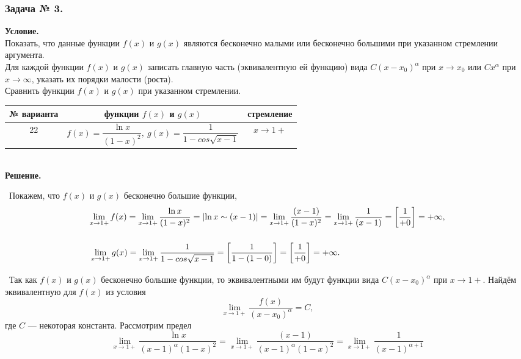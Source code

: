 \documentclass[12pt]{article}
\begin{document}
\subsubsection*{\center Задача № 3.}
{\bf Условие.~}\\
 Показать, что данные функции
$f(x)$ и $g(x)$ являются бесконечно малыми или бесконечно большими
при указанном стремлении аргумента. \\
 Для каждой функции $f(x)$ и $g(x)$ записать главную часть
(эквивалентную ей функцию)  вида $C(x-x_0)^{\alpha}$ при $x\rightarrow x_0$ или $Cx^{\alpha}$
при $x\rightarrow\infty$, указать их порядки малости (роста). \\
 Сравнить функции $f(x)$ и $g(x)$ при указанном стремлении.
\begin{center}
\begin{tabular}{|c|c|c|}
\hline
№ варианта & функции $f(x)$ и $g(x)$ & стремление \\[6pt]
\hline
22 & $f(x) = \dfrac{\ln{x}}{(1-x)^2},~g(x)=\dfrac{1}{1-cos\sqrt{x-1}}$ & $x\rightarrow1+$ \\
\hline
\end{tabular}
\bigskip
\\
{\bf Решение.~}\\
\end{center}
\medskip
{}~Покажем, что $f(x)$ и $g(x)$ бесконечно большие функции,
$$
\begin{array}{l} 
\lim\limits_{x\rightarrow 1+} f(x)=\lim\limits_{x\rightarrow 1+} \dfrac{\ln{x}}{(1-x)^2}=\left|\ln {x} \sim (x-1) \right|=\lim\limits_{x\rightarrow 1+} \dfrac{(x-1)}{(1-x)^2}=\lim\limits_{x\rightarrow 1+} \dfrac{1}{(x-1)}=\left[\dfrac{1}{+0} \right]=+\infty , 
\\ \medskip{}{}
\\ \medskip{}{}
\lim\limits_{x\rightarrow 1+} g(x)= \lim\limits_{x\rightarrow 1+}  \dfrac{1}{1-cos\sqrt{x-1}}=\left[\dfrac{1}{1-(1-0)} \right]=\left[\dfrac{1}{+0} \right]=+\infty.
\end{array}
$$
~Так как $f(x)$ и $g(x)$ бесконечно большие функции, то эквивалентными им будут функции вида 
$C(x-x_0)^{\alpha}$ при $x\rightarrow 1+$. Найдём эквивалентную для $f(x)$ из условия
$$
\lim\limits_{x\rightarrow 1+}\dfrac{f(x)}{(x-x_0)^{\alpha}} = C,
$$
где $C$ --- некоторая константа. Рассмотрим предел
$$
\lim\limits_{x\rightarrow 1+} \dfrac{\ln{x}}{(x-1)^{\alpha} (1-x)^2}=\lim\limits_{x\rightarrow 1+} \dfrac{(x-1)}{(x-1)^{\alpha}(1-x)^2}=\lim\limits_{x\rightarrow 1+} \dfrac{1}{(x-1)^{\alpha+1}}
$$
\end{document}
